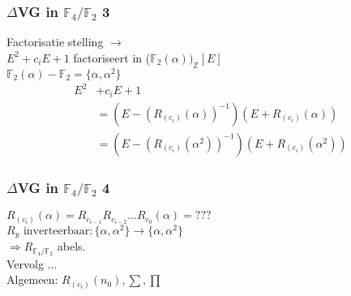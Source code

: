 \documentclass[20pt]{beamer}
\begin{document}
\begin{frame}
    \frametitle{$\Delta$VG in $\mathbb{F}_4/\mathbb{F}_2$ 3}
    Factorisatie stelling $\rightarrow$ \\ $E^2+c_iE+1$ factoriseert in ($\mathbb{F}_2(\alpha))_{\mathbb{Z}}[E]$ \\ \pause
    $\mathbb{F}_2(\alpha) - \mathbb{F}_2 = \{\alpha , \alpha^2 \} $ \pause
    \begin{align*}
        E^2 & +c_iE+1                                                     \\
            & = (E - (R_{(c_i)}(\alpha))^{-1})(E + R_{(c_i)}(\alpha))     \\
            & = (E - (R_{(c_i)}(\alpha^2))^{-1})(E + R_{(c_i)}(\alpha^2))
    \end{align*}
\end{frame}

\begin{frame}
    \frametitle{$\Delta$VG in $\mathbb{F}_4/\mathbb{F}_2$ 4}
    $R_{(c_i)}(\alpha) =  R_{c_{i-1}}R_{c_{i-2}} ... R_{c_{0}}(\alpha)= ???$ \\ \pause
    $R_y \text{ inverteerbaar}:\{\alpha , \alpha^2 \} \rightarrow \{\alpha , \alpha^2 \}$ \\ \pause
    $\Rightarrow R_{\mathbb{F}_4/\mathbb{F}_2}$ abels. \\ \pause
    Vervolg ... \\ \pause
    Algemeen: $R_{(c_i)}(n_0), \sum , \prod$
\end{frame}

\end{document}
